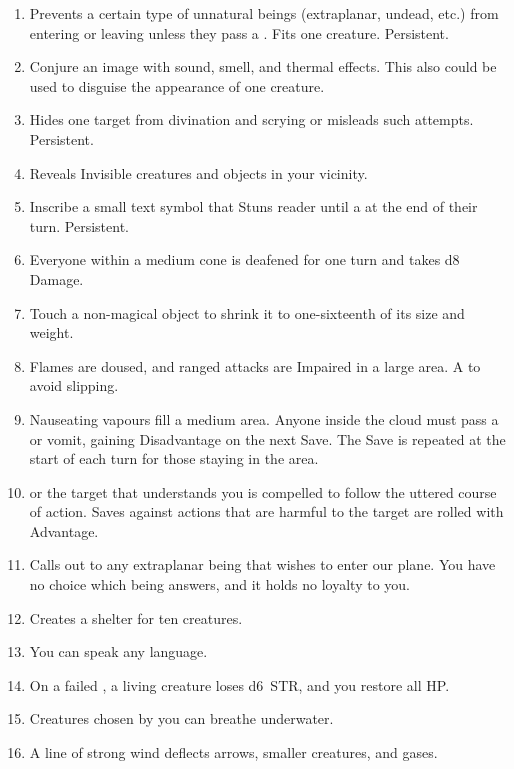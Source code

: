 \documentclass[itdr/core]{subfiles}
\begin{document}
\begin{enumerate}
	\vfill
	\break

	\item {} Prevents a certain type of unnatural beings (extraplanar, undead, etc.) from entering or leaving unless they pass a . Fits one creature. Persistent.
	\item {} Conjure an image with sound, smell, and thermal effects. This also could be used to disguise the appearance of one creature.
	\item {} Hides one target from \mbox{divination} and scrying or misleads such attempts. \mbox{Persistent.}
	\item {} Reveals Invisible creatures and objects in your vicinity.
	\item {} Inscribe a small text symbol that Stuns reader until a  at the end of their turn. Persistent.
	\item {} Everyone within a medium cone is deafened for one turn and takes d8 Damage.
	\item {} Touch a non-magical object to shrink it to one-sixteenth of its size and weight.
	\item {} Flames are doused, and ranged attacks are Impaired in a large area. A  to avoid slipping.
	\item {} Nauseating vapours fill a medium area. Anyone inside the cloud must pass a  or vomit, gaining Disadvantage on the next Save. The Save is repeated at the start of each turn for those staying in the area.
	\item {}  or the target that understands you is compelled to follow the uttered course of action. Saves against actions that are harmful to the target are rolled with Advantage.
	\item {} Calls out to any extraplanar being that wishes to enter our plane. You have no choice which being answers, and it holds no loyalty to you.
	\item {} Creates a shelter for ten creatures.
	\item {} You can speak any language.
	\item {} On a failed , a living creature loses d6~STR, and you restore all HP.
	\item {} Creatures chosen by you can breathe underwater.
	\item {} A line of strong wind deflects arrows, smaller creatures, and gases.
\end{enumerate}
\end{document}
